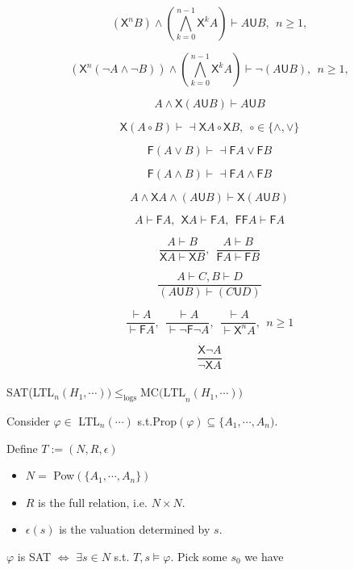 \documentclass[12pt]{article}
\begin{document}
\begin{CJK*}{GBK}{song}
$$(\textsf{X}^nB)\wedge \left(\bigwedge^{n-1}_{k=0}\textsf{X}^kA\right)\vdash A\textsf{U}B,\ \ n\geq 1, $$ %

$$(\textsf{X}^n(\neg A\wedge\neg B))\wedge \left(\bigwedge^{n-1}_{k=0}\textsf{X}^kA\right)\vdash \neg (A\textsf{U}B),\ \ n\geq 1, $$ %


$${A\wedge \textsf{X}(A\textsf{U}B)}\vdash {A\textsf{U}B}$$

$$\textsf{X}(A\circ B)\vdash\dashv \textsf{X}A\circ\textsf{X}B,\ \ \circ\in\{\wedge,\vee\}$$

$$\textsf{F}(A\vee B)\vdash \dashv \textsf{F}A\vee\textsf{F}B$$ %

$$\textsf{F}(A\wedge B)\vdash \dashv \textsf{F}A\wedge\textsf{F}B$$ %

$${A\wedge\textsf{X}A\wedge (A\textsf{U}B)}\vdash {\textsf{X}(A\textsf{U}B)}$$

$${A}\vdash {\textsf{F}A},\ \ {\textsf{X}A}\vdash {\textsf{F}A},\ \ {\textsf{FF}A}\vdash {\textsf{F}A}$$

$$\frac{A\vdash B}{\textsf{X}A\vdash \textsf{X}B},\ \ \frac{A\vdash B}{\textsf{F}A\vdash \textsf{F}B}  $$

$$\frac{A\vdash C, B\vdash D}{(A\textsf{U}B)\vdash (C\textsf{U}D)}$$

$$\frac{\vdash A}{\vdash \textsf{F}A}, \ \ \frac{\vdash A}{\vdash \neg \textsf{F}\neg A},\ \ \frac{\vdash A}{\vdash \textsf{X}^nA},\ \ n\geq 1$$


$$\frac{\textsf{X}\neg A}{\neg \textsf{X}A}$$
\ \\

SAT(LTL$_n(H_1,\cdots))\leq_{\text{logs}}\mbox{MC(LTL}_n(H_1,\cdots))$

Consider $\varphi\in$ LTL$_n(\cdots)$ s.t.Prop$(\varphi)\subseteq\{A_1,\cdots, A_n)$.

Define $T:=(N, R, \epsilon)$

\begin{itemize}
\item $N=$ Pow$(\{A_1,\cdots, A_n\})$

\item $R$ is the full relation, i.e. $N\times N$.

\item $\epsilon(s)$ is the valuation determined by $s$.
\end{itemize}

$\varphi$ is SAT  $\Longleftrightarrow$ $\exists s\in N$ s.t. $T,s\models \varphi$. Pick some $s_0$ we have


\end{CJK*}
\end{document}
